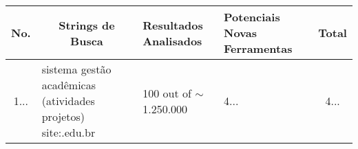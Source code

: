 \begin{table}[!htb]
  \centering
  \tiny
  \begin{tabular}{c|p{3cm}|l|p{1.5cm}|c}
    \bottomrule
    \rowcolor[rgb]{0.753,0.753,0.753} \textbf{No.} & \multicolumn{1}{c|}{\textbf{Strings de Busca}}                                                                                 & \textbf{Resultados Analisados}  & \textbf{Potenciais Novas Ferramentas} & \textbf{Total} \\
    \hline
    \rowcolor[rgb]{0.898,0.898,0.898} 1...            & sistema gestão acadêmicas (atividades \textbar{} projetos) site:.edu.br                                                     & 100 out of $\sim$1.250.000  & 4...                                                                & 4...              \\

\end{tabular}
\end{table}
